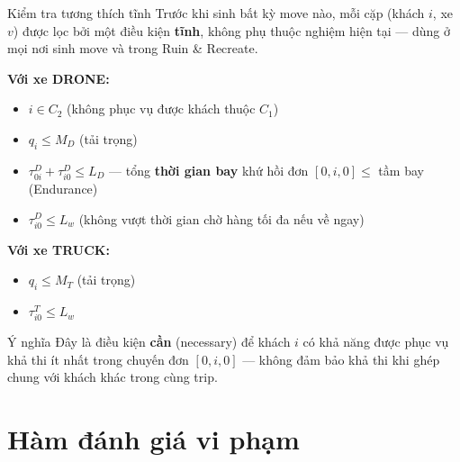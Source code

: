\documentclass[aspectratio=169]{beamer}
\newcommand{\hl}[1]{\textcolor{blue!60!black}{\textbf{#1}}}
\begin{document}
\begin{frame}{Kiểm tra tương thích tĩnh }
  \small Trước khi sinh bất kỳ move nào, mỗi cặp (khách $i$, xe $v$) được lọc bởi một điều kiện \hl{tĩnh}, không phụ thuộc nghiệm hiện tại — dùng ở mọi nơi sinh move và trong Ruin \& Recreate.

  \vspace{2mm}
  \textbf{Với xe DRONE:}
  \begin{itemize}
    \item \small $i \in C_2$ (không phục vụ được khách thuộc $C_1$)
    \item \small $q_i \le M_D$ (tải trọng)
    \item \small $\tau^{D}_{0i} + \tau^{D}_{i0} \le L_D$ — tổng \hl{thời gian bay} khứ hồi đơn $[0,i,0] \le$ tầm bay (Endurance)
    \item \small $\tau^{D}_{i0} \le L_w$ (không vượt thời gian chờ hàng tối đa nếu về ngay)
  \end{itemize}

  \vspace{2mm}
  \textbf{Với xe TRUCK:}
  \begin{itemize}
    \item \small $q_i \le M_T$ (tải trọng)
    \item \small $\tau^{T}_{i0} \le L_w$
  \end{itemize}

  \vspace{2mm}
  \begin{alertblock}{Ý nghĩa}
    \small Đây là điều kiện \hl{cần} (necessary) để khách $i$ có khả năng được phục vụ khả thi ít nhất trong chuyến đơn $[0,i,0]$ — không đảm bảo khả thi khi ghép chung với khách khác trong cùng trip.
  \end{alertblock}
\end{frame}

\section{Hàm đánh giá vi phạm}
\end{document}
